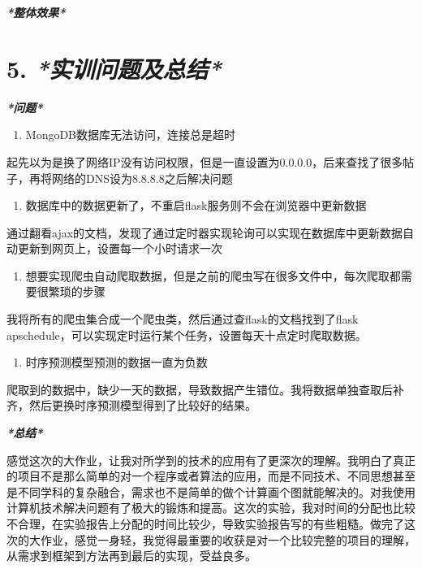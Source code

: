 \documentclass[
]{article}
\begin{document}
\emph{\textbf{*整体效果*}}

\hypertarget{5-ux5b9eux8badux95eeux9898ux53caux603bux7ed3}{%
\section{\texorpdfstring{\textbf{5.}
\emph{\textbf{*实训问题及总结*}}}{5. *实训问题及总结*}}\label{5-ux5b9eux8badux95eeux9898ux53caux603bux7ed3}}

\emph{\textbf{*问题*}}

\begin{enumerate}
\def\labelenumi{\arabic{enumi}.}
\item
  MongoDB数据库无法访问，连接总是超时
\end{enumerate}

起先以为是换了网络IP没有访问权限，但是一直设置为0.0.0.0，后来查找了很多帖子，再将网络的DNS设为8.8.8.8之后解决问题

\begin{enumerate}
\def\labelenumi{\arabic{enumi}.}
\item
  数据库中的数据更新了，不重启flask服务则不会在浏览器中更新数据
\end{enumerate}

通过翻看ajax的文档，发现了通过定时器实现轮询可以实现在数据库中更新数据自动更新到网页上，设置每一个小时请求一次

\begin{enumerate}
\def\labelenumi{\arabic{enumi}.}
\item
  想要实现爬虫自动爬取数据，但是之前的爬虫写在很多文件中，每次爬取都需要很繁琐的步骤
\end{enumerate}

我将所有的爬虫集合成一个爬虫类，然后通过查flask的文档找到了flask
apschedule，可以实现定时运行某个任务，设置每天十点定时爬取数据。

\begin{enumerate}
\def\labelenumi{\arabic{enumi}.}
\item
  时序预测模型预测的数据一直为负数
\end{enumerate}

爬取到的数据中，缺少一天的数据，导致数据产生错位。我将数据单独查取后补齐，然后更换时序预测模型得到了比较好的结果。

\emph{\textbf{*总结*}}

感觉这次的大作业，让我对所学到的技术的应用有了更深次的理解。我明白了真正的项目不是那么简单的对一个程序或者算法的应用，而是不同技术、不同思想甚至是不同学科的复杂融合，需求也不是简单的做个计算画个图就能解决的。对我使用计算机技术解决问题有了极大的锻炼和提高。这次的实验，我对时间的分配也比较不合理，在实验报告上分配的时间比较少，导致实验报告写的有些粗糙。做完了这次的大作业，感觉一身轻，我觉得最重要的收获是对一个比较完整的项目的理解，从需求到框架到方法再到最后的实现，受益良多。
\end{document}
